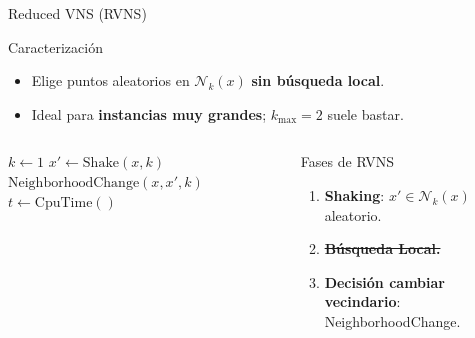 \documentclass[aspectratio=169, 11pt, xcolor={dvipsnames,table}]{beamer}
\begin{document}
\begin{frame}{Reduced VNS (RVNS)}
\begin{block}{Caracterización}
\begin{itemize}
  \item Elige puntos aleatorios en $\mathcal{N}_k(x)$ \textbf{sin búsqueda local}.
  \item Ideal para \textbf{instancias muy grandes}; $k_{\max}=2$ suele bastar.
\end{itemize}
\end{block}

\vspace{-4pt}

\begin{columns}[T]

\scriptsize
\begin{algorithm}[H]
\caption{RVNS$(x, k_{\max}, t_{\max})$}
\begin{algorithmic}[1]
\Repeat
  \State $k \gets 1$
  \Repeat
    \State $x' \gets \text{Shake}(x, k)$
    \State $\text{NeighborhoodChange}(x, x', k)$
  \State $t \gets \text{CpuTime}()$
\end{algorithmic}
\end{algorithm}


\center
\begin{alertblock}{Fases de RVNS}
\begin{enumerate}
  \item \textbf{Shaking}: $x' \in \mathcal{N}_k(x)$ aleatorio.
  \item \st{\textbf{Búsqueda Local.}}
  \item \textbf{Decisión cambiar vecindario}: NeighborhoodChange.
\end{enumerate}
\end{alertblock}
\end{columns}

\end{frame}






\end{document}
